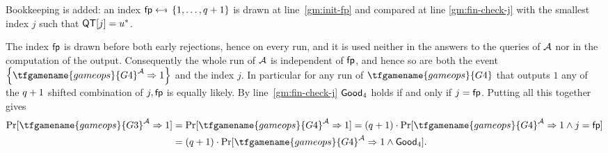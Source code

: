 Bookkeeping is added: an index $\fpguess \sample \set{1 \until \numRO+1}$ is drawn at line~\ref{gm:init-fp} and compared at line \ref{gm:fin-check-j} with the smallest index $j$ such that $\mathsf{QT}[j] = u^*$.

The index $\mathsf{fp}$ is drawn before both early rejections, hence on every run, and it is used neither in the answers to the queries of $\mathcal{A}$ nor in the computation of the output.
Consequently the whole run of $\mathcal{A}$ is independent of $\mathsf{fp}$, and hence so are both the event $\set{\tfgamename{gameops}{G4}^\adv \Rightarrow 1}$ and the index $j$.
In particular for any run of $\tfgamename{gameops}{G4}$ that outputs $1$ any of the $q +1$ shifted combination of $j,\mathsf{fp}$ is equally likely.
By line~\ref{gm:fin-check-j} $\mathsf{Good}_4$ holds if and only if $j = \mathsf{fp}$.
Putting all this together gives
\begin{equation}\label{eq:g3g4}
    \begin{aligned}
        \Pr[\tfgamename{gameops}{G3}^\adv \Rightarrow 1]
            &= \Pr[\tfgamename{gameops}{G4}^\adv \Rightarrow 1]
            = (\numRO+1)\cdot
            \Pr[\tfgamename{gameops}{G4}^\adv \Rightarrow 1 \wedge j = \fpguess] 
            \\
            &= (\numRO+1)\cdot
            \Pr[\tfgamename{gameops}{G4}^\adv \Rightarrow 1 \wedge \goodev_4].
    \end{aligned}
\end{equation}

